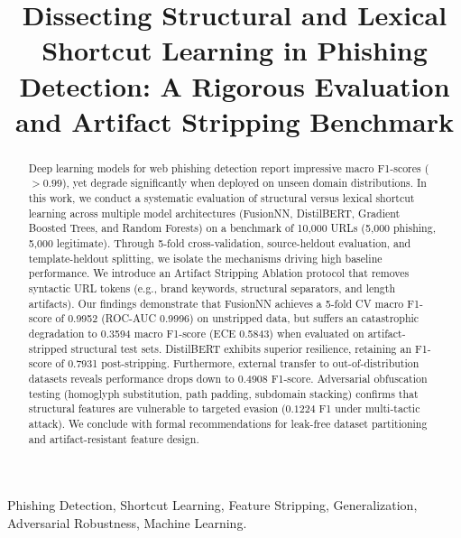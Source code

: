 \documentclass[conference,10pt]{IEEEtran}
\begin{document}
\title{Dissecting Structural and Lexical Shortcut Learning in Phishing Detection: A Rigorous Evaluation and Artifact Stripping Benchmark}

\author{
}

\maketitle

\begin{abstract}
Deep learning models for web phishing detection report impressive macro F1-scores ($>0.99$), yet degrade significantly when deployed on unseen domain distributions. In this work, we conduct a systematic evaluation of structural versus lexical shortcut learning across multiple model architectures (FusionNN, DistilBERT, Gradient Boosted Trees, and Random Forests) on a benchmark of 10,000 URLs (5,000 phishing, 5,000 legitimate). Through 5-fold cross-validation, source-heldout evaluation, and template-heldout splitting, we isolate the mechanisms driving high baseline performance. We introduce an Artifact Stripping Ablation protocol that removes syntactic URL tokens (e.g., brand keywords, structural separators, and length artifacts). Our findings demonstrate that FusionNN achieves a 5-fold CV macro F1-score of 0.9952 (ROC-AUC 0.9996) on unstripped data, but suffers an catastrophic degradation to 0.3594 macro F1-score (ECE 0.5843) when evaluated on artifact-stripped structural test sets. DistilBERT exhibits superior resilience, retaining an F1-score of 0.7931 post-stripping. Furthermore, external transfer to out-of-distribution datasets reveals performance drops down to 0.4908 F1-score. Adversarial obfuscation testing (homoglyph substitution, path padding, subdomain stacking) confirms that structural features are vulnerable to targeted evasion ($0.1224$ F1 under multi-tactic attack). We conclude with formal recommendations for leak-free dataset partitioning and artifact-resistant feature design.
\end{abstract}

\begin{IEEEkeywords}
Phishing Detection, Shortcut Learning, Feature Stripping, Generalization, Adversarial Robustness, Machine Learning.
\end{IEEEkeywords}
\end{document}
